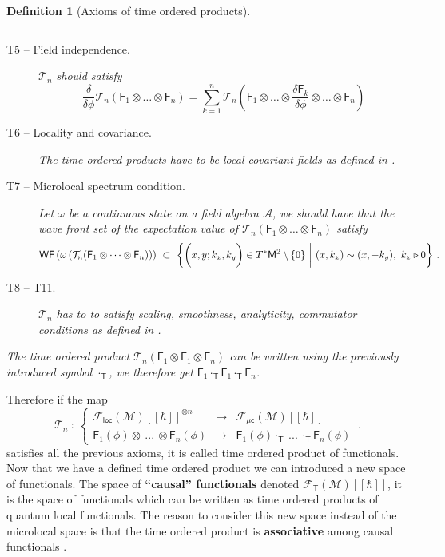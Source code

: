 \documentclass[11pt]{book}
\newcommand{\WF}{\mathsf{WF}}
\newcommand{\loc}{\mathsf{loc}}
\newcommand{\muc}{\mu\csf}
\newcommand{\Acal}{\mathcal{A}}
\newcommand{\Fcal}{\mathcal{F}}
\newcommand{\Mcal}{\mathcal{M}}
\newcommand{\Tcal}{\mathcal{T}}
\newcommand{\Fsf}{\mathsf{F}}
\newcommand{\Msf}{\mathsf{M}}
\newcommand{\Tsf}{\mathsf{T}}
\newcommand{\csf}{\mathsf{c}}
\theoremstyle{break}
\newtheorem{definition}{Definition}[chapter]
\begin{document}
\begin{definition}[Axioms of time ordered products]
\begin{description}
\begin{equation*}
\end{equation*}
%
\item[T5 -- Field independence.]\label{item:T5} $\Tcal_n$ should satisfy
%
\begin{equation*}
\frac{\delta}{\delta\phi} \Tcal_n(\Fsf_1\otimes\dots\otimes\Fsf_n) = \sum_{k=1}^n \Tcal_n\left(\Fsf_1\otimes\dots\otimes \frac{\delta\Fsf_k}{\delta\phi} \otimes\dots\otimes\Fsf_n\right)
\end{equation*}
%
\item[T6 -- Locality and covariance.]\label{item:T6} The time ordered products have to be local covariant fields as defined in \cite{HW_2001}.
%
\item[T7 -- Microlocal spectrum condition.]\label{item:T7} Let $\omega$ be a continuous state on a field algebra $\Acal$, we should have that the wave front set of the expectation value of $\Tcal_n(\Fsf_1\otimes\dots\otimes\Fsf_n)$ satisfy 
%
\begin{equation*}
\WF\left(\omega\left(\Tcal_n(\Fsf_1\otimes\dots\otimes\Fsf_n)\right)\right) \ \subset \ \bigg\{ \bigg( x, y ; k_x, k_y \bigg) \in T^\ast\Msf^2 \setminus \{0\} \ \bigg| \ (x,k_x) \sim (x,-k_y), \ k_x \triangleright 0 \bigg\} \ .
\vspace*{-10pt}
\end{equation*}
%
\item[T8 -- T11.]\label{item:T8_T11} $\Tcal_n$ has to to satisfy scaling, smoothness, analyticity, commutator conditions as defined in \cite{HW_2001}.
\end{description}
%
The time ordered product $\Tcal_n(\Fsf_1\otimes\Fsf_1\otimes\Fsf_n)$ can be written using the previously introduced symbol $\cdot_\Tsf$, we therefore get $\Fsf_1\cdot_\Tsf\Fsf_1\cdot_\Tsf\Fsf_n$. 
\end{definition}

Therefore if the map
%
\begin{equation*}
\Tcal_n \ : \ 
\left\{
\begin{array}{lcl}
\Fcal_{\loc}(\Mcal)[[\hbar]]^{\otimes n} & \to & \Fcal_{\muc}(\Mcal)[[\hbar]] \\
\Fsf_1(\phi) \otimes \ ... \ \otimes \Fsf_n(\phi) & \mapsto & \Fsf_1(\phi) \cdot_{\Tsf} \ ... \ \cdot_{\Tsf} \Fsf_n(\phi)
\end{array}
\right. \ .
\end{equation*}
%
satisfies all the previous axioms, it is called time ordered product of functionals. Now that we have a defined time ordered product we can introduced a new space of functionals.  The space of \textbf{``causal'' functionals} denoted $\Fcal_\Tsf(\Mcal)[[\hbar]]$\index{$\Fcal_\Tsf(\Mcal)$}, it is the space of functionals which can be written as time ordered products of quantum local functionals. The reason to consider this new space instead of the microlocal space is that the time ordered product is \textbf{associative} among causal functionals \cite{FR_2013}.
\end{document}
